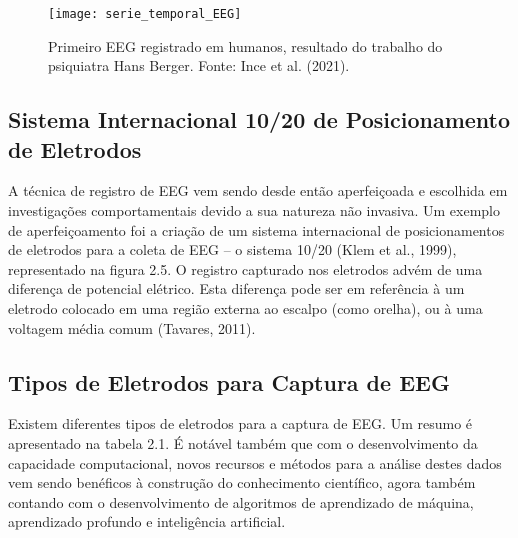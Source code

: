   \begin{figure}[h]
    \centering
    \texttt{[image: serie\_temporal\_EEG]}
    \caption[]{Primeiro EEG registrado em humanos, resultado do trabalho do psiquiatra Hans Berger. Fonte: Ince et al. (2021).} 
    \end{figure}

    

\subsection{Sistema Internacional 10/20 de Posicionamento de Eletrodos} 

    A técnica de registro de EEG vem sendo desde então aperfeiçoada e escolhida em
    investigações comportamentais devido a sua natureza não invasiva. Um exemplo de
    aperfeiçoamento foi a criação de um sistema internacional de posicionamentos de
    eletrodos para a coleta de EEG – o sistema 10/20 (Klem et al., 1999), representado na figura 2.5.
    O registro capturado nos eletrodos
    advém de uma diferença de potencial elétrico. Esta diferença pode ser em referência à
    um eletrodo colocado em uma região externa ao escalpo (como orelha), ou à uma
    voltagem média comum (Tavares, 2011).

    
        
\subsection{Tipos de Eletrodos para Captura de EEG}

    Existem diferentes tipos de eletrodos para a captura de EEG. Um resumo é apresentado na tabela 2.1. É notável também que com o desenvolvimento da capacidade computacional, novos recursos e métodos para a análise destes dados vem sendo benéficos à construção do conhecimento científico, agora também contando com o desenvolvimento de algoritmos de aprendizado de máquina, aprendizado profundo e inteligência artificial. 
  






